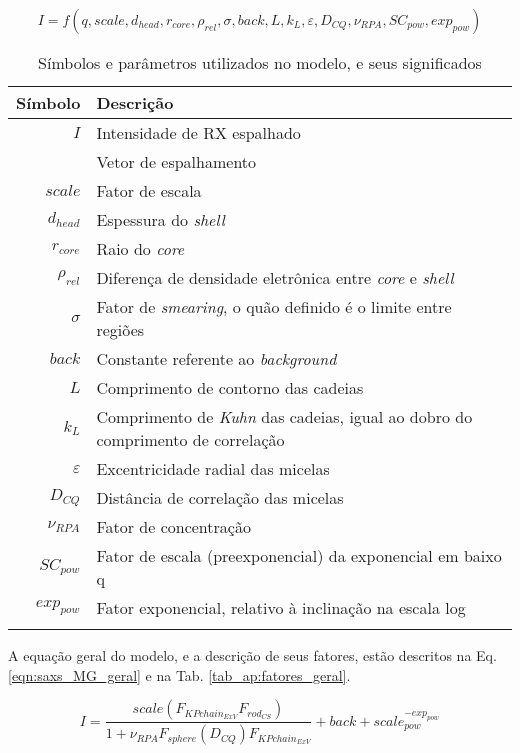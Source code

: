 \begin{apendicesenv}
	\begin{equation}
	I = f(q, scale, d_{head}, r_{core}, \rho_{rel}, \sigma, back, L, k_L, \varepsilon, D_{CQ}, \nu_{RPA}, SC_{pow}, exp_{pow})
	\label{eqn:saxs_MG_superficial}
	\end{equation}
	\begin{longtable}[c]{r p{12cm}}
		\toprule
		Símbolo 			& Descrição        						\\
		\midrule
		$I$					& Intensidade de RX espalhado			\\
		\q					& Vetor de espalhamento					\\
		\midrule
		$scale$				& Fator de escala						\\
		$d_{head}$			& Espessura do \emph{shell}				\\
		$r_{core}$			& Raio do \emph{core}					\\
		$\rho_{rel}$		& Diferença de densidade eletrônica entre \emph{core} e \emph{shell} \\
		$\sigma$			& Fator de \emph{smearing}, o quão definido é o limite entre regiões \\
		$back$				& Constante referente ao \emph{background} \\
		$L$					& Comprimento de contorno das cadeias 	\\
		$k_L$				& Comprimento de \emph{Kuhn} das cadeias, igual ao dobro do comprimento de correlação \\ %
		$\varepsilon$			& Excentricidade radial das micelas		\\
		$D_{CQ}$			& Distância de correlação das micelas 	\\
		$\nu_{RPA}$			& Fator de concentração					\\
		\midrule
		$SC_{pow}$			& Fator de escala (preexponencial) da exponencial em baixo q\\
		$exp_{pow}$			& Fator exponencial, relativo à inclinação na escala log\\
		\bottomrule
		\caption{Símbolos e parâmetros utilizados no modelo, e seus significados}
		\label{tab_ap:simbolos} 
	\end{longtable}
	
	A equação geral do modelo, e a descrição de seus fatores, estão descritos na Eq.\ref{eqn:saxs_MG_geral} e na Tab. \ref{tab_ap:fatores_geral}.
	
	\begin{equation}
	I = \frac{scale\left(F_{KPchain_{ExV}}F_{rod_{CS}}\right)}{1 + \nu_{RPA} F_{sphere}\left( D_{CQ}\right) F_{KPchain_{ExV}}} + back + scale_{pow}^{-exp_{pow}}
	\label{eqn:saxs_MG_geral}
	\end{equation}
	

\end{apendicesenv}
